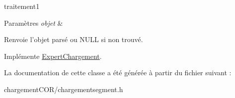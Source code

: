 traitement1 


\begin{DoxyParams}{Paramètres}
{\em objet} & \\
\hline
\end{DoxyParams}
\begin{DoxyReturn}{Renvoie}
l'objet parsé ou N\+U\+L\+L si non trouvé. 
\end{DoxyReturn}


Implémente \hyperlink{class_expert_chargement_a7d7818bdd5f0a06b06bfc8047ec8fee5}{Expert\+Chargement}.



La documentation de cette classe a été générée à partir du fichier suivant \+:\begin{DoxyCompactItemize}
\item 
chargement\+C\+O\+R/chargementsegment.\+h\end{DoxyCompactItemize}
